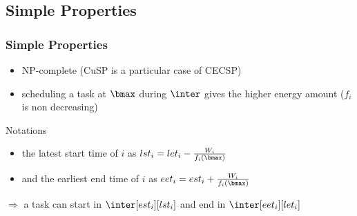 \subsection{Simple Properties}
\begin{frame}
  \frametitle{Simple Properties}
  \begin{itemize}
\vfill
  \item NP-complete (CuSP is a particular case of CECSP)
\vfill
\pause
  \item scheduling a task at $\bmax$ during $\inter$ gives the higher energy amount ($f_i$ is non decreasing)
\vfill\end{itemize}
\begin{center}
  \end{center}

\pause

\vfill
  \begin{block}{Notations}
    \begin{itemize}
    \item the latest start time of $i$ as $lst_i=let_i-\frac{W_i}{f_i(\bmax)}$
    \item and the earliest end time of $i$ as $eet_i=est_i+\frac{W_i}{f_i(\bmax)}$
    \end{itemize}
  \end{block}
\vfill
\pause

  $\Rightarrow$ a task can start in $\inter[est_i][lst_i]$ and end in $\inter[eet_i][let_i]$
\vfill
\end{frame}
